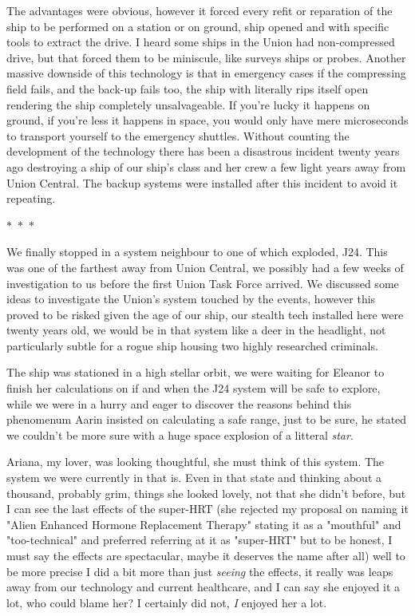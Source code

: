 \documentclass[colorlinks,12pt,a4paper]{book}
\newcommand\sep{\begin{center}
  \boldmath $\ast$~$\ast$~$\ast$
\end{center}}
\begin{document}
 The advantages were obvious, however it forced every refit or reparation 
 of the ship to be performed on a station or on ground, ship opened and with specific tools to extract the drive. I heard some ships in the Union 
 had non-compressed drive, but that forced them to be miniscule, like surveys ships or probes. Another massive downside of this 
 technology is that in emergency cases if the compressing field fails, and the back-up fails too, the ship with literally rips itself open 
 rendering the ship completely unsalvageable. If you're lucky it happens on ground, if you're less it happens in space, you would only have 
 mere microseconds to transport yourself to the emergency shuttles. Without counting the development of the technology there has been a disastrous
 incident twenty years ago destroying a ship of our ship's class and her crew a few light years away from Union Central. The backup systems were 
 installed after this incident to avoid it repeating.
 
 \sep 
 
 We finally stopped in a system neighbour to one of which exploded, J24. This was one of the farthest away from Union Central, we possibly had a few weeks of 
 investigation to us before the first Union Task Force arrived. We discussed some ideas to investigate the Union's system touched by the events,
 however this proved to be risked given the age of our ship, our stealth tech installed here were twenty years old, we would be in that system like
 a deer in the headlight, not particularly subtle for a rogue ship housing two highly researched criminals.\par
 \bigskip
 
 The ship was stationed in a high stellar orbit, we were waiting for Eleanor to finish her calculations on if and when the 
 J24 system will be safe to explore, while we were in a hurry and eager to discover the reasons behind this phenomenum Aarin 
 insisted on calculating a safe range, just to be sure, he stated we couldn't be more sure with a huge space explosion of a 
 litteral \textit{star}.\par 
 \bigskip
 
 Ariana, my lover, was looking thoughtful, she must think of this system. The system we were currently in that is. Even in that 
 state and thinking about a thousand, probably grim, things she looked lovely, not that she didn't before, but I can see the last 
 effects of the super-HRT (she rejected my proposal on naming it "Alien Enhanced Hormone Replacement Therapy" stating it 
 as a "mouthful" and "too-technical" and preferred referring at it as "super-HRT" but to be honest, I must say the effects are 
 spectacular, maybe it deserves the name after all) well to be more precise I did a bit more than just \textit{seeing} the effects, 
 it really was leaps away from our technology and current healthcare, and I can say she enjoyed it a lot, who could blame her? I certainly 
 did not, \textit{I} enjoyed her a lot.\par 
 \bigskip 
 
\end{document}
